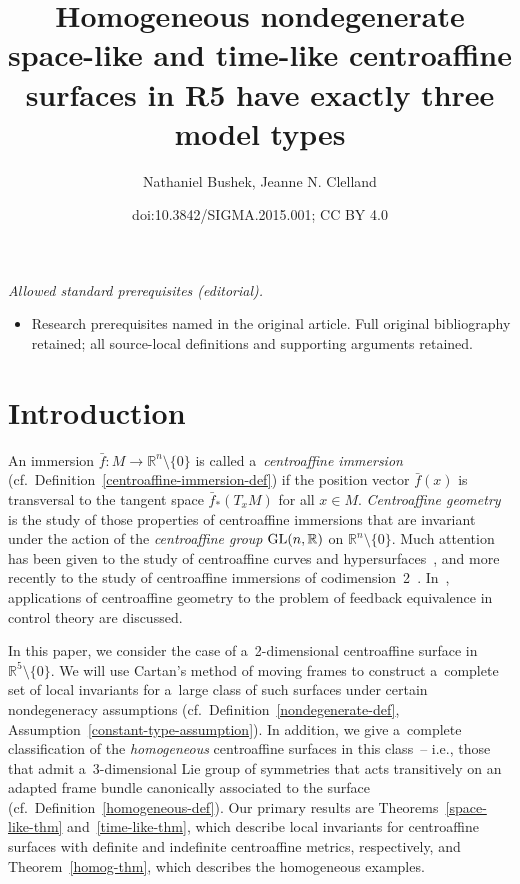 \documentclass[10pt,a4paper]{amsart}
\title{Homogeneous nondegenerate space-like and time-like centroaffine surfaces in R5 have exactly three model types}
\author{Nathaniel Bushek, Jeanne N. Clelland}
\date{doi:10.3842/SIGMA.2015.001; CC BY 4.0}
\numberwithin{equation}{section}
\theoremstyle{definition}
\begin{document}
\maketitle
\noindent\textit{Allowed standard prerequisites (editorial).}\begin{itemize}
\item Research prerequisites named in the original article. Full original bibliography retained; all source-local definitions and supporting arguments retained.
\end{itemize}\medskip
\section{Introduction}

An immersion $\bar{f}:M \to \mathbb{R}^n \setminus \{0 \}$ is called a~{\em centroaffine immersion}
(cf.~Def\/inition~\ref{centroaffine-immersion-def}) if the position vector $\bar{f}(x)$ is transversal to the tangent
space $\bar{f}_*(T_xM)$ for all $x\in M$.
{\em Centroaffine geometry} is the study of those properties of centroaf\/f\/ine immersions that are invariant under the
action of the {\em centroaffine group} ${\rm GL}(n,\mathbb{R})$ on $\mathbb{R}^n \setminus \{0 \}$.
Much attention has been given to the study of centroaf\/f\/ine curves and hypersurfaces~\cite{GW97, Laugwitz65, Wang91,Wang95,MM33,
Scharlach97, Scharlach96, Wang94}, and more recently to the study of centroaf\/f\/ine immersions of
codimension~2~\cite{Furuhata00, Furuhata02,NS93, Scharlach95,Scharlach99, Scharlach98, Yang08, Yang13}.
In~\cite{Wilkens99}, applications of centroaf\/f\/ine geometry to the problem of feedback equivalence in control theory are
discussed.

In this paper, we consider the case of a~2-dimensional centroaf\/f\/ine surface in $\mathbb{R}^5 \setminus \{0 \}$.
We will use Cartan's method of moving frames to construct a~complete set of local invariants for a~large class of such
surfaces under certain nondegeneracy assumptions (cf.\ Def\/inition~\ref{nondegenerate-def},
Assumption~\ref{constant-type-assumption}).
In addition, we give a~complete classif\/ication of the {\em homogeneous} centroaf\/f\/ine surfaces in this class~-- i.e.,
those that admit a~3-dimensional Lie group of symmetries that acts transitively on an adapted frame bundle canonically
associated to the surface (cf.\ Def\/inition~\ref{homogeneous-def}).
Our primary results are Theorems~\ref{space-like-thm} and~\ref{time-like-thm}, which describe local invariants for
centroaf\/f\/ine surfaces with def\/inite and indef\/inite centroaf\/f\/ine metrics, respectively, and Theorem~\ref{homog-thm},
which describes the homogeneous examples.
\end{document}
